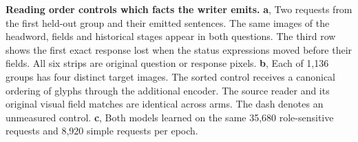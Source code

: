 \textbf{Reading order controls which facts the writer emits.} \textbf{a}, Two requests from the first held-out group and their emitted sentences. The same images of the headword, fields and historical stages appear in both questions. The third row shows the first exact response lost when the status expressions moved before their fields. All six strips are original question or response pixels. \textbf{b}, Each of 1,136 groups has four distinct target images. The sorted control receives a canonical ordering of glyphs through the additional encoder. The source reader and its original visual field matches are identical across arms. The dash denotes an unmeasured control. \textbf{c}, Both models learned on the same 35,680 role-sensitive requests and 8,920 simple requests per epoch.
